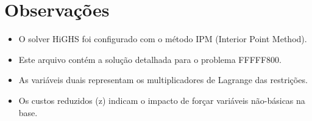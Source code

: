 \documentclass[12pt]{article}
\begin{document}
\section{Observações}

\begin{itemize}
\item O solver HiGHS foi configurado com o método IPM (Interior Point Method).
\item Este arquivo contém a solução detalhada para o problema FFFFF800.
\item As variáveis duais representam os multiplicadores de Lagrange das restrições.
\item Os custos reduzidos (z) indicam o impacto de forçar variáveis não-básicas na base.
\end{itemize}
\end{document}
